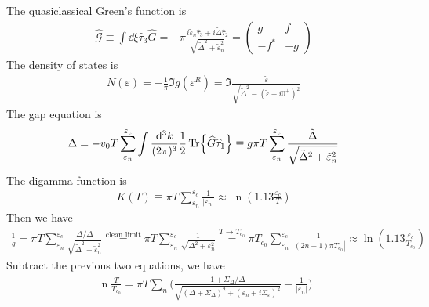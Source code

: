 \documentclass[]{article}
\begin{document}
The quasiclassical Green's function is
\begin{align}
    \widehat{\mathcal{G}} \equiv \int\dd\xi\widehat{\tau}_3\widehat{G}
    =-\pi\frac{i\tilde{\varepsilon}_n\widehat{\tau}_3 + i\tilde{\Delta}\widehat{\tau}_2}
    {\sqrt{\tilde{\Delta}^2 + \tilde{\varepsilon}_n^2}}
    =\begin{pmatrix}
         g    & f  \\
         -f^* & -g
     \end{pmatrix}
\end{align}
The density of states is
\begin{align}
    N(\varepsilon) = -\frac{1}{\pi}\Im{g(\varepsilon^R)}
    = \Im{\frac{\tilde{\varepsilon}}{\sqrt{\tilde{\Delta}^2 - (\tilde{\varepsilon} + i0^+)^2}}}
\end{align}
The gap equation is
\begin{align}\label{eq:gap_eq}
    \Delta = -v_0 T\sum_{\varepsilon_n}^{\varepsilon_c}\int\frac{\dd[3]k}{(2\pi)^3}\frac{1}{2}\Tr{\widehat{G}\widehat{\tau}_1}
    \equiv g\pi T\sum_{\varepsilon_n}^{\varepsilon_c}\frac{\tilde{\Delta}}{\sqrt{\tilde{\Delta}^2 + \tilde{\varepsilon}_n^2}}
\end{align}
The digamma function is
\begin{align}
    K(T) \equiv \pi T \sum_{\varepsilon_n}^{\varepsilon_c}\frac{1}{|\varepsilon_n|} \approx \ln(1.13\frac{\varepsilon_c}{T})
\end{align}
Then we have
\begin{align}
    \frac{1}{g} = \pi T\sum_{\varepsilon_n}^{\varepsilon_c}
    \frac{\tilde{\Delta}/\Delta}{\sqrt{\tilde{\Delta}^2 + \tilde{\varepsilon}_n^2}}
    \overset{\text{clean limit}}{=} \pi T\sum_{\varepsilon_n}^{\varepsilon_c}
    \frac{1}{\sqrt{\Delta^2 + \varepsilon_n^2}}
    \overset{T\rightarrow T_{c_0}}{=}\pi T_{c_0}\sum_{\varepsilon_n}^{\varepsilon_c}\frac{1}{|(2n+1)\pi T_{c_0}|}
    \approx \ln(1.13\frac{\varepsilon_c}{T_{c_0}})
\end{align}
Subtract the previous two equations, we have
\begin{align}
    \ln\frac{T}{T_{c_0}} = \pi T\sum_n
    \Bigg(\frac{1 + \Sigma_\Delta/\Delta}{\sqrt{(\Delta + \Sigma_\Delta)^2 + (\varepsilon_n + i\Sigma_\varepsilon)^2}}
    - \frac{1}{|\varepsilon_n|}\Bigg)
\end{align}
\end{document}
